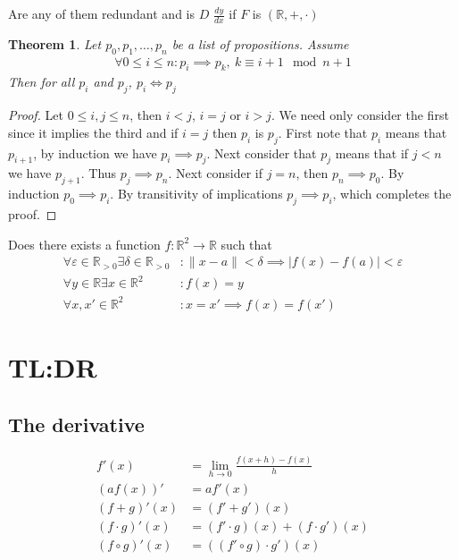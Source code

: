 \documentclass{article}
\theoremstyle{plain}
\newtheorem{theorem}{Theorem}
\theoremstyle{definition}
\begin{document}
Are any of them redundant and is $D$ $\frac{dy}{dx}$ if $F$ is
$(\mathbb{R},+,\cdot)$
\begin{theorem}
	Let $p_0,p_1,\dots,p_n$ be a list of propositions. Assume
	\begin{align}
		\forall 0 \leq i \leq n: p_i \implies p_k,\ k \equiv i+1 \mod n+1
	\end{align}
	Then for all $p_i$ and $p_j$, $p_i \iff p_j$
\end{theorem}
\begin{proof}
	Let $0 \leq i,j \leq n$, then $i < j$, $i = j$ or $i > j$. We need
	only consider the first since it implies the third and if $i = j$
	then $p_i$ is $p_j$. First note that $p_i$ means that $p_{i+1}$, by
	induction we have $p_i \implies p_j $. Next consider that $p_j$ means that
	if $j < n$ we have $p_{j+1}$. Thus $p_j \implies p_n $. Next consider if $j
	=n$, then $p_n \implies p_0$. By induction $p_0 \implies p_i $. By
	transitivity of implications $p_j \implies p_i$, which completes the proof.
\end{proof}
Does there exists a function $f: \mathbb{R}^2 \rightarrow \mathbb{R}$
such that 
\begin{align}
	\forall \varepsilon \in \mathbb{R}_{>0}
	\exists \delta \in \mathbb{R}_{>0}&: \|x-a\| < \delta \implies
	|f(x)-f(a)|<\varepsilon \\
	\forall y \in \mathbb{R} \exists x \in \mathbb{R}^2&: f(x)=y \\
	\forall x,x' \in \mathbb{R}^2&: x = x' \implies f(x)=f(x')
\end{align}
\newpage
\section{TL:DR}
\subsection{The derivative}
\begin{align*}
	f'(x) &= \lim_{h \rightarrow 0} \frac{f(x+h)-f(x)}{h}\\
	(af(x))' &= af'(x)\\
	(f+g)'(x) &= (f'+g')(x)\\
	(f\cdot g)'(x) &= (f'\cdot g)(x)+(f\cdot g')(x)\\
	(f\circ g)'(x) &= ((f'\circ g)\cdot g')(x)
\end{align*}
\end{document}
